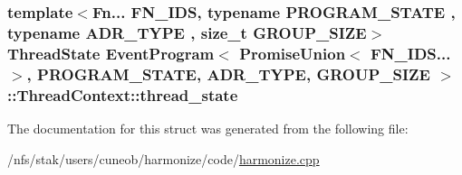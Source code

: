 \hypertarget{structEventProgram_3_01PromiseUnion_3_01FN__IDS_8_8_8_4_00	PROGRAM__STATE_00	ADR__TYPE_00	GROUP__SIZE_01_4_1_1ThreadContext_aae34c4ce5b6ebc86fc95bed11f56186b}{
\subsubsection[{thread\-\_\-state}]{\setlength{\rightskip}{0pt plus 5cm}template$<$Fn... F\-N\-\_\-\-I\-D\-S, typename P\-R\-O\-G\-R\-A\-M\-\_\-\-S\-T\-A\-T\-E , typename A\-D\-R\-\_\-\-T\-Y\-P\-E , size\-\_\-t G\-R\-O\-U\-P\-\_\-\-S\-I\-Z\-E$>$ {\bf Thread\-State} {\bf Event\-Program}$<$ {\bf Promise\-Union}$<$ F\-N\-\_\-\-I\-D\-S...$>$,	P\-R\-O\-G\-R\-A\-M\-\_\-\-S\-T\-A\-T\-E,	A\-D\-R\-\_\-\-T\-Y\-P\-E,	G\-R\-O\-U\-P\-\_\-\-S\-I\-Z\-E $>$\-::Thread\-Context\-::thread\-\_\-state}}\label{structEventProgram_3_01PromiseUnion_3_01FN__IDS_8_8_8_4_00	PROGRAM__STATE_00	ADR__TYPE_00	GROUP__SIZE_01_4_1_1ThreadContext_aae34c4ce5b6ebc86fc95bed11f56186b}


The documentation for this struct was generated from the following file\-:\begin{DoxyCompactItemize}
\item 
/nfs/stak/users/cuneob/harmonize/code/\hyperlink{harmonize_8cpp}{harmonize.\-cpp}\end{DoxyCompactItemize}
